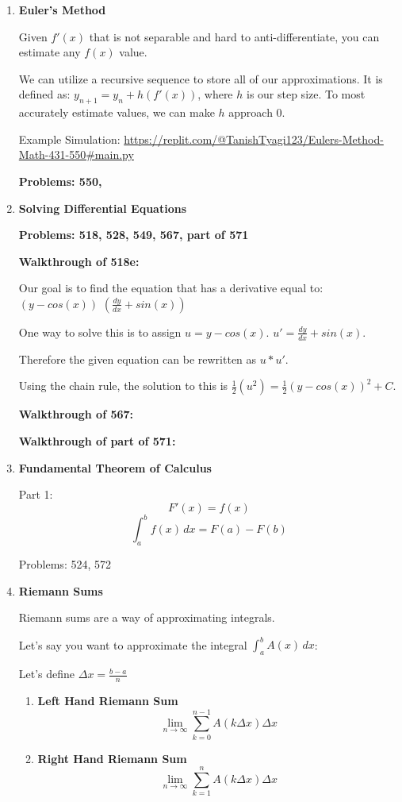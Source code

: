 \documentclass[11pt,twoside]{article}
\begin{document}
\begin{enumerate}
\item \textbf{Euler's Method}

Given $f'(x)$ that is not separable and hard to anti-differentiate, you can estimate any $f(x)$ value. 

We can utilize a recursive sequence to store all of our approximations. It is defined as: $y_{n+1} = y_{n} + h(f'(x))$, where $h$ is our step size. To most accurately estimate values, we can make $h$ approach 0.

Example Simulation: \url{https://replit.com/@TanishTyagi123/Eulers-Method-Math-431-550#main.py}

\textbf{Problems: 550,} 

\item \textbf{Solving Differential Equations}

\textbf{Problems: 518, 528, 549, 567, part of 571}

\textbf{Walkthrough of 518e:}

Our goal is to find the equation that has a derivative equal to: $(y-cos(x))$ $(\frac{dy}{dx} + sin(x))$

One way to solve this is to assign $u = y-cos(x)$. $u' = \frac{dy}{dx} + sin(x)$. 

Therefore the given equation can be rewritten as $u * u'$.

Using the chain rule, the solution to this is $\frac{1}{2}(u^2) = \frac{1}{2}(y-cos(x))^2 + C.$

\textbf{Walkthrough of 567:} 

\textbf{Walkthrough of part of 571:}


\item \textbf{Fundamental Theorem of Calculus} 

Part 1: 
$$ F'(x) = f(x) $$
$$ \int_{a}^{b} f(x) \,dx = F(a) - F(b) $$

Problems: 524, 572

\item \textbf{Riemann Sums}

Riemann sums are a way of approximating integrals. 

Let's say you want to approximate the integral $\int_{a}^{b} A(x) \,dx$: 

Let's define $\Delta x = \frac{b - a}{n}$

    \begin{enumerate}
    \item \textbf{Left Hand Riemann Sum}
$$
\lim_{n\to\infty} \sum_{k=0} ^{n-1} A(k\Delta x)\Delta x 
$$
    \item \textbf{Right Hand Riemann Sum}
$$
\lim_{n\to\infty} \sum_{k=1} ^{n} A(k\Delta x)\Delta x 
$$


\end{enumerate}
\end{enumerate}
\end{document}
